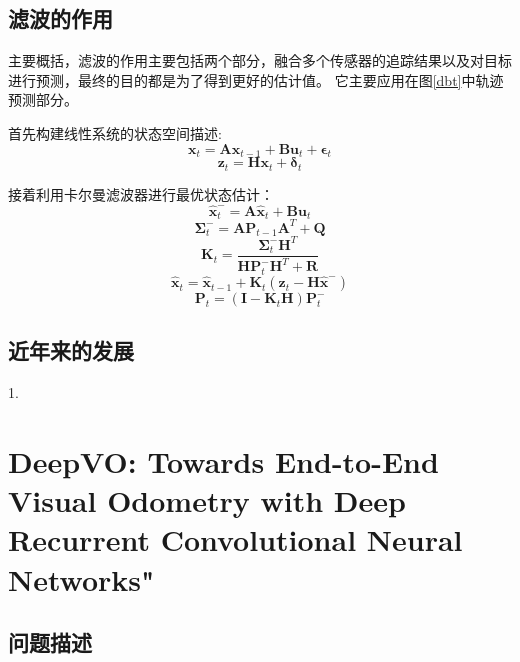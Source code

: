 \section{滤波的作用}
主要概括，滤波的作用主要包括两个部分，融合多个传感器的追踪结果以及对目标进行预测，最终的目的都是为了得到更好的估计值。
它主要应用在图\ref{dbt}中轨迹预测部分。

\begin{tcolorbox}[]
	首先构建线性系统的状态空间描述:
	$$ \mathbf{x}_{t} = \mathbf{A} \mathbf{x}_{t-1} + \mathbf{B} \mathbf{u}_{t} + \bm{\epsilon}_{t} $$
	$$  \mathbf{z}_{t} = \mathbf{H} \mathbf{x}_{t} + \bm{\delta}_{t} $$
	
	接着利用卡尔曼滤波器进行最优状态估计：
	\begin{equation}
		\hat{\bm{x}}_{t}^{-} =  \bm{A} \hat{\bm{x}}_{t} + \bm{B} \bm{u}_t
	\end{equation}
	\begin{equation}
		\bm{\Sigma}_{t}^{-} = \bm{A} \bm{P}_{t-1} \bm{A}^{T} + \bm{Q}
	\end{equation}
	\begin{equation}
		\bm{K}_t = \frac{\bm{\Sigma}_{t}^{-} \bm{H}^{T}}{\bm{H} \bm{P}_{t}^{-} \bm{H}^{T} + \bm{R} }
	\end{equation}
	\begin{equation}
		\hat{\bm{x}}_t = \hat{\bm{x}}_{t-1} + \bm{K}_t(\bm{z}_t - \bm{H} \hat{\bm{x}}^{-})
	\end{equation}
	\begin{equation}
		\bm{P}_t = (\bm{I} - \bm{K}_t \bm{H}) \bm{P}_{t}^{-}
	\end{equation}
	
\end{tcolorbox}

\section{近年来的发展}

1. 


\chapter{DeepVO: Towards End-to-End Visual Odometry with Deep Recurrent Convolutional Neural Networks"\cite{wang_deepvo_nodate}}

\section{问题描述}

